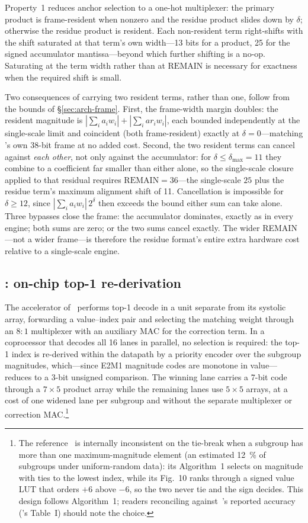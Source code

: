 Property~1 reduces anchor selection to a one-hot multiplexer: the primary
product is frame-resident when nonzero and the residue product slides down by
$\delta$; otherwise the residue product is resident. Each non-resident term
right-shifts with the shift saturated at that term's own width---13 bits for a
product, 25 for the signed accumulator mantissa---beyond which further shifting
is a no-op. Saturating at the term width rather than at $\mathrm{REMAIN}$ is
necessary for exactness when the required shift is small.

Two consequences of carrying two resident terms, rather than one, follow from
the bounds of \S\ref{sec:arch-frame}. First, the frame-width margin doubles: the
resident magnitude is $|\sum_i a_i w_i| + |\sum_i \mathit{ar}_i w_i|$, each bounded
independently at the single-scale limit and coincident (both frame-resident)
exactly at $\delta=0$---matching \fpfour's own 38-bit frame at no added cost.
Second, the two resident terms can cancel against \emph{each other}, not only
against the accumulator: for $\delta\le\delta_{\max}=11$ they combine to a
coefficient far smaller than either alone, so the single-scale closure applied
to that residual requires $\mathrm{REMAIN}=36$---the single-scale $25$ plus the
residue term's maximum alignment shift of 11. Cancellation is impossible for
$\delta\ge 12$, since $|\sum_i a_i w_i|\,2^{\delta}$ then exceeds the bound either
sum can take alone. Three bypasses close the frame: the accumulator dominates,
exactly as in every engine; both sums are zero; or the two sums cancel exactly.
The wider REMAIN---not a wider frame---is therefore the residue format's entire
extra hardware cost relative to a single-scale engine.

\subsection{\mtwo: on-chip top-1 re-derivation}
\label{sec:arch-m2}

The \mtwo{} accelerator of~\cite{m2xfp2026} performs top-1 decode in a unit
separate from its systolic array, forwarding a value–index pair and selecting
the matching weight through an $8{:}1$ multiplexer with an auxiliary MAC for the
correction term. In a coprocessor that decodes all 16 lanes in parallel, no
selection is required: the top-1 index is re-derived within the datapath by a
priority encoder over the subgroup magnitudes, which---since E2M1 magnitude
codes are monotone in value---reduces to a 3-bit unsigned comparison. The
winning lane carries a 7-bit code through a $7{\times}5$ product array while the
remaining lanes use $5{\times}5$ arrays, at a cost of one widened lane per
subgroup and without the separate multiplexer or correction
MAC.\footnote{The reference~\cite{m2xfp2026} is internally inconsistent on the
tie-break when a subgroup has more than one maximum-magnitude element (an
estimated \SI{12}{\percent} of subgroups under uniform-random data): its
Algorithm~1 selects on magnitude with ties to the lowest index, while its
Fig.~10 ranks through a signed value LUT that orders $+6$ above $-6$, so the two
never tie and the sign decides. This design follows Algorithm~1; readers
reconciling against~\cite{m2xfp2026}'s reported accuracy (\cite{m2xfp2026}'s Table~I)
should note the choice.}

